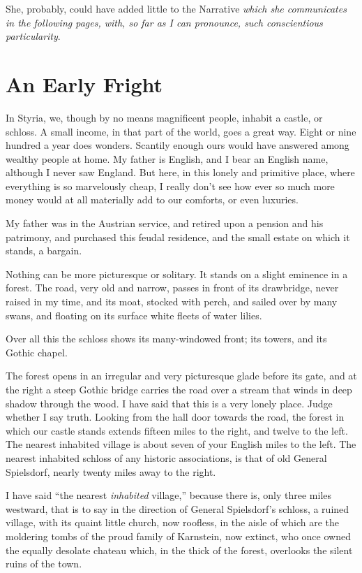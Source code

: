 \documentclass[11pt,twoside,makeidx,hidelinks,]{memoir}
\begin{document}
She, probably, could have added little to the Narrative \emph{which she
communicates in the following pages, with, so far as I can pronounce,
such conscientious particularity}.

\pbreak{}

\chapter{An Early Fright}\hypertarget{an-early-fright}{}\label{an-early-fright}

In Styria, we, though by no means magnificent people, inhabit a castle,
or schloss. A small income, in that part of the world, goes a great way.
Eight or nine hundred a year does wonders. Scantily enough ours would
have answered among wealthy people at home. My father is English, and I
bear an English name, although I never saw England. But here, in this
lonely and primitive place, where everything is so marvelously cheap, I
really don't see how ever so much more money would at all materially add
to our comforts, or even luxuries.

My father was in the Austrian service, and retired upon a pension and
his patrimony, and purchased this feudal residence, and the small estate
on which it stands, a bargain.

Nothing can be more picturesque or solitary. It stands on a slight
eminence in a forest. The road, very old and narrow, passes in front of
its drawbridge, never raised in my time, and its moat, stocked with
perch, and sailed over by many swans, and floating on its surface white
fleets of water lilies.

Over all this the schloss shows its many-windowed front; its towers,
and its Gothic chapel.

The forest opens in an irregular and very picturesque glade before its
gate, and at the right a steep Gothic bridge carries the road over a
stream that winds in deep shadow through the wood. I have said that this
is a very lonely place. Judge whether I say truth. Looking from the hall
door towards the road, the forest in which our castle stands extends
fifteen miles to the right, and twelve to the left. The nearest
inhabited village is about seven of your English miles to the left. The
nearest inhabited schloss of any historic associations, is that of old
General Spielsdorf, nearly twenty miles away to the right.

I have said ``the nearest \emph{inhabited} village,'' because there is, only
three miles westward, that is to say in the direction of General
Spielsdorf's schloss, a ruined village, with its quaint little church,
now roofless, in the aisle of which are the moldering tombs of the proud
family of Karnstein, now extinct, who once owned the equally desolate
chateau which, in the thick of the forest, overlooks the silent ruins
of the town.
\end{document}
